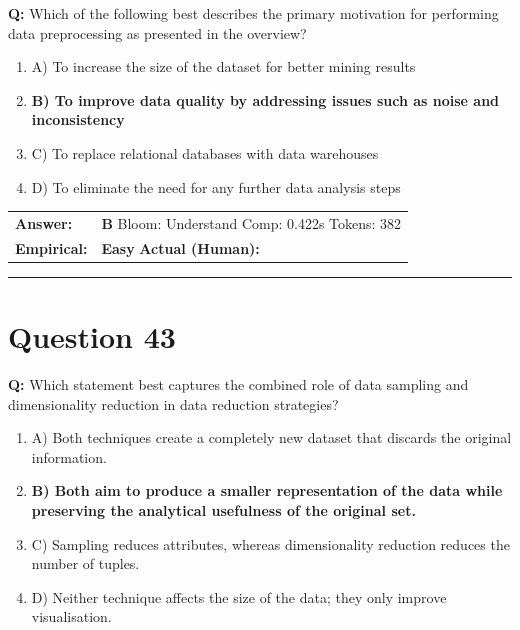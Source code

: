 \documentclass[9pt]{article}
\begin{document}
\textbf{Q:} Which of the following best describes the primary motivation for performing data preprocessing as presented in the overview?

\begin{enumerate}[label=\textbf{\alph{*})}, nosep]
    \item A) To increase the size of the dataset for better mining results
    \item \textbf{B) To improve data quality by addressing issues such as noise and inconsistency} %
    \item C) To replace relational databases with data warehouses
    \item D) To eliminate the need for any further data analysis steps

\end{enumerate}

\begin{tabular}{@{}l p{10.5cm}@{}}
\textbf{Answer:} & \textbf{B} \hspace{1em} Bloom: Understand \hspace{1em} Comp: 0.422s \hspace{1em} Tokens: 382 \\
\textbf{Empirical:} & \textbf{Easy} \hspace{1em} \textbf{Actual (Human):} \underline{\hspace{5cm}}
\end{tabular}

\vspace{0.2cm}
\rule{\textwidth}{0.4pt}
\vspace{0.2cm}


\section*{Question 43}

\textbf{Q:} Which statement best captures the combined role of data sampling and dimensionality reduction in data reduction strategies?

\begin{enumerate}[label=\textbf{\alph{*})}, nosep]
    \item A) Both techniques create a completely new dataset that discards the original information.
    \item \textbf{B) Both aim to produce a smaller representation of the data while preserving the analytical usefulness of the original set.} %
    \item C) Sampling reduces attributes, whereas dimensionality reduction reduces the number of tuples.
    \item D) Neither technique affects the size of the data; they only improve visualisation.

\end{enumerate}
\end{document}
